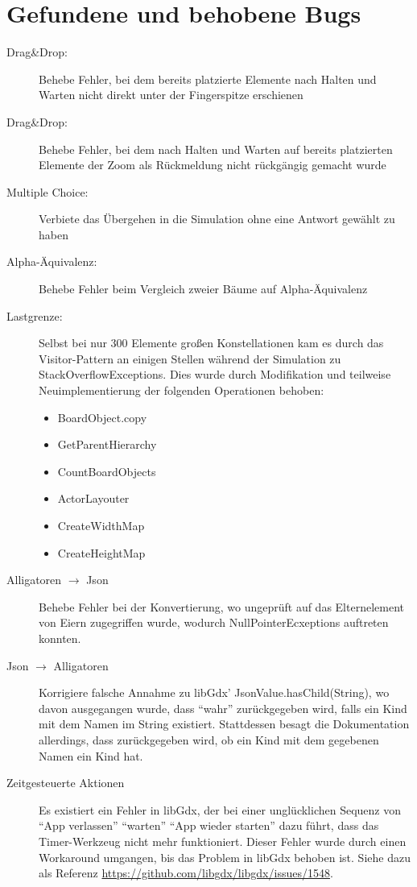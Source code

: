 \chapter{Gefundene und behobene Bugs}
\begin{description}
	\item[Drag\&Drop:] Behebe Fehler, bei dem bereits platzierte Elemente nach Halten und Warten nicht direkt unter der Fingerspitze erschienen
	\item[Drag\&Drop:] Behebe Fehler, bei dem nach Halten und Warten auf bereits platzierten Elemente der Zoom als Rückmeldung nicht rückgängig gemacht wurde
	\item[Multiple Choice:] Verbiete das Übergehen in die Simulation ohne eine Antwort gewählt zu haben
	\item[Alpha-Äquivalenz:] Behebe Fehler beim Vergleich zweier Bäume auf Alpha-Äquivalenz
	\item[Lastgrenze:] Selbst bei nur 300 Elemente großen Konstellationen kam es durch das Visitor-Pattern an einigen Stellen während der Simulation zu StackOverflowExceptions. 
		Dies wurde durch Modifikation und teilweise Neuimplementierung der folgenden Operationen behoben:
		\begin{itemize}
			\item BoardObject.copy
			\item GetParentHierarchy
			\item CountBoardObjects
			\item ActorLayouter
			\item CreateWidthMap
			\item CreateHeightMap
		\end{itemize}
	\item[Alligatoren $\rightarrow$ Json] Behebe Fehler bei der Konvertierung, wo ungeprüft auf das Elternelement von Eiern zugegriffen wurde, wodurch NullPointerEcxeptions auftreten konnten.
	\item[Json $\rightarrow$ Alligatoren] Korrigiere falsche Annahme zu libGdx' JsonValue.hasChild(String), wo davon ausgegangen wurde, dass "`wahr"' zurückgegeben wird, falls ein Kind mit dem Namen im String existiert. 
		Stattdessen besagt die Dokumentation allerdings, dass zurückgegeben wird, ob ein Kind mit dem gegebenen Namen ein Kind hat.
	\item[Zeitgesteuerte Aktionen] Es existiert ein Fehler in libGdx, der bei einer unglücklichen Sequenz von "`App verlassen"' "`warten"' "`App wieder starten"' dazu führt, dass das Timer-Werkzeug nicht mehr funktioniert.
		Dieser Fehler wurde durch einen Workaround umgangen, bis das Problem in libGdx behoben ist. Siehe dazu als Referenz \url{https://github.com/libgdx/libgdx/issues/1548}.

\end{description}
